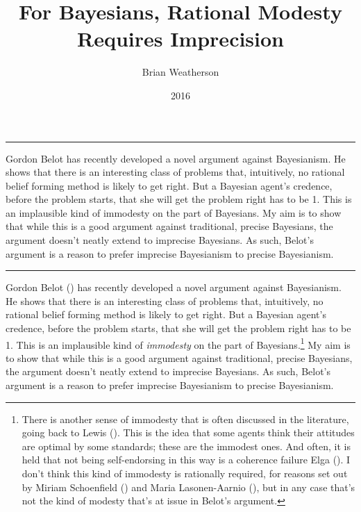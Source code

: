 \documentclass[
  10pt,
  letterpaper,
  DIV=11,
  numbers=noendperiod,
  twoside]{scrartcl}
\title{For Bayesians, Rational Modesty Requires Imprecision}
\author{Brian Weatherson}
\date{2016}
\renewenvironment{abstract}
 {\vspace{-1.25cm}
 \quotation\small\noindent\rule{\linewidth}{.5pt}\par\smallskip
 \noindent }
 {\par\noindent\rule{\linewidth}{.5pt}\endquotation}
\begin{document}
\maketitle
\begin{abstract}
Gordon Belot has recently developed a novel argument against
Bayesianism. He shows that there is an interesting class of problems
that, intuitively, no rational belief forming method is likely to get
right. But a Bayesian agent's credence, before the problem starts, that
she will get the problem right has to be 1. This is an implausible kind
of immodesty on the part of Bayesians. My aim is to show that while this
is a good argument against traditional, precise Bayesians, the argument
doesn't neatly extend to imprecise Bayesians. As such, Belot's argument
is a reason to prefer imprecise Bayesianism to precise Bayesianism.
\end{abstract}

Gordon Belot () has recently developed a
novel argument against Bayesianism. He shows that there is an
interesting class of problems that, intuitively, no rational belief
forming method is likely to get right. But a Bayesian agent's credence,
before the problem starts, that she will get the problem right has to be
1. This is an implausible kind of \emph{immodesty} on the part of
Bayesians.\footnote{There is another sense of immodesty that is often
  discussed in the literature, going back to Lewis
  (). This is the idea that some agents
  think their attitudes are optimal by some standards; these are the
  immodest ones. And often, it is held that not being self-endorsing in
  this way is a coherence failure Elga
  (). I don't think this kind of
  immodesty is rationally required, for reasons set out by Miriam
  Schoenfield () and Maria
  Lasonen-Aarnio (), but in any
  case that's not the kind of modesty that's at issue in Belot's
  argument.} My aim is to show that while this is a good argument
against traditional, precise Bayesians, the argument doesn't neatly
extend to imprecise Bayesians. As such, Belot's argument is a reason to
prefer imprecise Bayesianism to precise Bayesianism.
\end{document}
